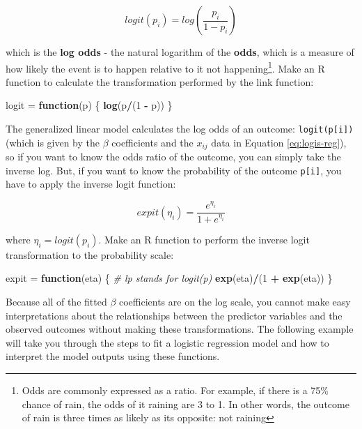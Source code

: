 \documentclass[]{book}
\newenvironment{Shaded}{\begin{snugshade}}{\end{snugshade}}
\newcommand{\KeywordTok}[1]{\textcolor[rgb]{0.13,0.29,0.53}{\textbf{#1}}}
\newcommand{\DecValTok}[1]{\textcolor[rgb]{0.00,0.00,0.81}{#1}}
\newcommand{\StringTok}[1]{\textcolor[rgb]{0.31,0.60,0.02}{#1}}
\newcommand{\CommentTok}[1]{\textcolor[rgb]{0.56,0.35,0.01}{\textit{#1}}}
\newcommand{\ControlFlowTok}[1]{\textcolor[rgb]{0.13,0.29,0.53}{\textbf{#1}}}
\newcommand{\OperatorTok}[1]{\textcolor[rgb]{0.81,0.36,0.00}{\textbf{#1}}}
\newcommand{\NormalTok}[1]{#1}
\let\rmarkdownfootnote\footnote%
\def\footnote{\protect\rmarkdownfootnote}
\theoremstyle{definition}
\theoremstyle{definition}
\theoremstyle{definition}
\theoremstyle{remark}
\begin{document}
\begin{equation}
  logit(p_i) = log\left(\frac{p_i}{1-p_i}\right)
\label{eq:logit}
\end{equation}

which is the \textbf{log odds} - the natural logarithm of the
\textbf{odds}, which is a measure of how likely the event is to happen
relative to it not happening\footnote{Odds are commonly expressed as a
  ratio. For example, if there is a 75\% chance of rain, the odds of it
  raining are 3 to 1. In other words, the outcome of rain is three times
  as likely as its opposite: not raining}. Make an R function to
calculate the transformation performed by the link function:

\begin{Shaded}
\begin{Highlighting}[]
\NormalTok{logit =}\StringTok{ }\ControlFlowTok{function}\NormalTok{(p) \{}
  \KeywordTok{log}\NormalTok{(p}\OperatorTok{/}\NormalTok{(}\DecValTok{1} \OperatorTok{-}\StringTok{ }\NormalTok{p))}
\NormalTok{\}}
\end{Highlighting}
\end{Shaded}

The generalized linear model calculates the log odds of an outcome:
\texttt{logit(p{[}i{]})} (which is given by the \(\beta\) coefficients
and the \(x_{ij}\) data in Equation \eqref{eq:logis-reg}), so if you want
to know the odds ratio of the outcome, you can simply take the inverse
log. But, if you want to know the probability of the outcome
\texttt{p{[}i{]}}, you have to apply the inverse logit function:

\begin{equation}
  expit(\eta_i)=\frac{e^{\eta_i}}{1 + e^{\eta_i}}
\label{eq:expit}
\end{equation}

where \(\eta_i = logit(p_i)\). Make an R function to perform the inverse
logit transformation to the probability scale:

\begin{Shaded}
\begin{Highlighting}[]
\NormalTok{expit =}\StringTok{ }\ControlFlowTok{function}\NormalTok{(eta) \{  }\CommentTok{# lp stands for logit(p)}
  \KeywordTok{exp}\NormalTok{(eta)}\OperatorTok{/}\NormalTok{(}\DecValTok{1} \OperatorTok{+}\StringTok{ }\KeywordTok{exp}\NormalTok{(eta))}
\NormalTok{\}}
\end{Highlighting}
\end{Shaded}

Because all of the fitted \(\beta\) coefficients are on the log scale,
you cannot make easy interpretations about the relationships between the
predictor variables and the observed outcomes without making these
transformations. The following example will take you through the steps
to fit a logistic regression model and how to interpret the model
outputs using these functions.
\end{document}
